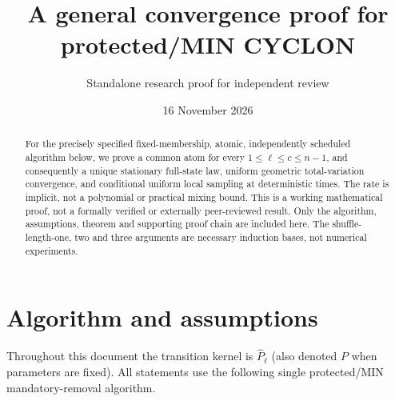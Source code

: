 \documentclass[11pt]{article}
\title{A general convergence proof for protected/MIN CYCLON}
\author{Standalone research proof for independent review}
\date{16 November 2026}
\begin{document}
\maketitle
\begin{abstract}
For the precisely specified fixed-membership, atomic, independently
scheduled algorithm below, we prove a common atom for every
$1\le\ell\le c\le n-1$, and consequently a unique stationary full-state
law, uniform geometric total-variation convergence, and conditional
uniform local sampling at deterministic times. The rate is implicit,
not a polynomial or practical mixing bound. This is a working mathematical
proof, not a formally verified or externally peer-reviewed result.
Only the algorithm, assumptions, theorem and supporting proof chain
are included here. The shuffle-length-one, two and three arguments are
necessary induction bases, not numerical experiments.
\end{abstract}
\tableofcontents


\section{Algorithm and assumptions}
\label{sec:target}

Throughout this document the transition kernel is $\widehat P_\ell$
(also denoted $P$ when parameters are fixed). All statements use the
following single protected/MIN mandatory-removal algorithm.
\end{document}
